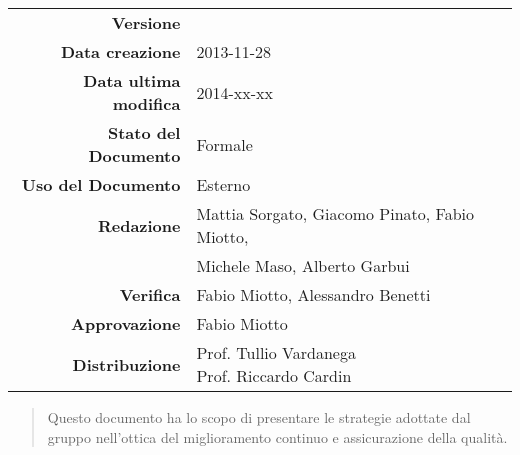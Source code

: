 

\newcommand{\Versione}{\versionePianoDiQualifica{}}	%
\newcommand{\Data}{2013-11-28}						%
\newcommand{\DataUltimaModifica}{2014-xx-xx}
\newcommand{\TipoDocumento}{Piano di Qualifica}		%





\begin{center}
\begin{tabular}{r|l}
\textbf{Versione} & \Versione{} \\
\textbf{Data creazione} & \Data{} \\
\textbf{Data ultima modifica} & \DataUltimaModifica{} \\
\textbf{Stato del Documento} & Formale \\		%
\textbf{Uso del Documento} & Esterno \\			%
\textbf{Redazione} & Mattia Sorgato, Giacomo Pinato, Fabio Miotto,\\			%
& Michele Maso, Alberto Garbui \\
\textbf{Verifica} & Fabio Miotto, Alessandro Benetti \\%
\textbf{Approvazione} & Fabio Miotto\\				%
\textbf{Distribuzione} & \parbox[t]{4cm}{Prof. Tullio Vardanega \\ Prof. Riccardo Cardin \\ \Prop{} }
\end{tabular}
\end{center}

\vspace{0.05in}

\begin{abstract}
\begin{center}
Questo documento ha lo scopo di presentare le strategie adottate dal gruppo \NomeGruppo{} nell'ottica del miglioramento continuo e assicurazione della qualità.
\end{center}
\end{abstract}

